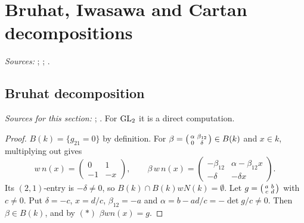 
\chapter{Bruhat, Iwasawa and Cartan decompositions}\label{ch:ch-0-05-decompositions}

\noindent\emph{Sources:} \cite[§1]{Cas-p}; \cite[§2]{JL}; \cite{BumpH}.

\section{Bruhat decomposition}\label{sec:decomp-bruhat}

\noindent\emph{Sources for this section:} \cite[§2]{JL}; \cite[§1]{Cas-p}. For $\mathrm{GL}_2$ it is a direct computation.

\begin{theorem}
\end{theorem}
\begin{proof}
$B(k)=\{g_{21}=0\}$ by definition. For $\beta=\begin{psmallmatrix}\alpha&\beta_{12}\\0&\delta\end{psmallmatrix}\in B(k)$ and $x\in k$,
multiplying out gives
\[
  w\,n(x)=\begin{pmatrix}0&1\\-1&-x\end{pmatrix},\qquad
  \beta\,w\,n(x)=\begin{pmatrix}-\beta_{12}&\alpha-\beta_{12}x\\-\delta&-\delta x\end{pmatrix}.\tag{$*$}
\]
Its $(2,1)$-entry is $-\delta\neq0$, so $B(k)\cap B(k)wN(k)=\emptyset$. Let $g=\begin{psmallmatrix}a&b\\c&d\end{psmallmatrix}$
with $c\neq0$. Put $\delta=-c$, $x=d/c$, $\beta_{12}=-a$ and $\alpha=b-ad/c=-\det g/c\neq0$. Then $\beta\in B(k)$, and by
$(*)$ $\beta wn(x)=g$.
\end{proof}


